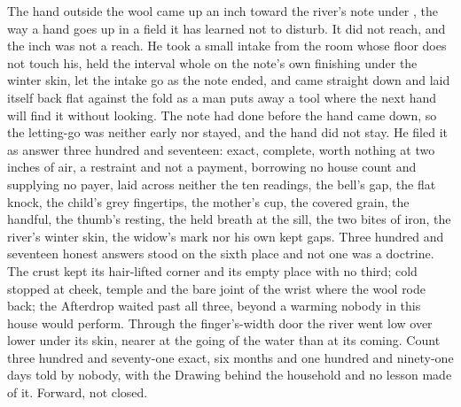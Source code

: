 The hand outside the wool came up an inch toward the river's note under , the way a hand goes up in a field it has learned not to disturb. It did not reach, and the inch was not a reach. He took a small intake from the room whose floor does not touch his, held the interval whole on the note's own finishing under the winter skin, let the intake go as the note ended, and came straight down and laid itself back flat against the fold as a man puts away a tool where the next hand will find it without looking. The note had done before the hand came down, so the letting-go was neither early nor stayed, and the hand did not stay. He filed it as answer three hundred and seventeen: exact, complete, worth nothing at two inches of air, a restraint and not a payment, borrowing no house count and supplying no payer, laid across neither the ten readings, the bell's gap, the flat knock, the child's grey fingertips, the mother's cup, the covered grain, the handful, the thumb's resting, the held breath at the sill, the two bites of iron, the river's winter skin, the widow's mark nor his own kept gaps. Three hundred and seventeen honest answers stood on the sixth place and not one was a doctrine. The crust kept its hair-lifted corner and its empty place with no third; cold stopped at cheek, temple and the bare joint of the wrist where the wool rode back; the Afterdrop waited past all three, beyond a warming nobody in this house would perform. Through the finger's-width door the river went low over lower under its skin, nearer at the going of the water than at its coming. Count three hundred and seventy-one exact, six months and one hundred and ninety-one days told by nobody, with the Drawing behind the household and no lesson made of it. Forward, not closed.
